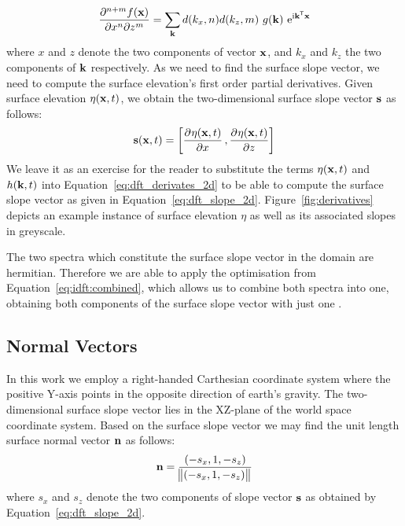 \begin{equation}
\label{eq:dft_derivates_2d}
 \dmd{f(\mvec{x})}{n+m}{x}{n}{z}{m} = \sum_{\mvec{k}}d(k_{x}, n)d(k_{z}, m)~g(\mvec{k})~\mathrm{e}^{\mathrm{i}\transpose{\mvec{k}}\mvec{x}}
\end{equation}
where $x$ and $z$ denote the two components of vector $\mathbf{x}$, and $k_x$ and $k_z$ 
the two components of \wavevector $\mathbf{k}$ respectively.
As we need to find the surface slope vector, we need to compute 
the surface elevation's first order partial derivatives. Given surface 
elevation $\eta(\mathbf{x},t)$, we obtain the two-dimensional surface slope 
vector $\mathbf{s}$ as follows:
\begin{equation}
\label{eq:dft_slope_2d}
 \mvec{s}(\mvec{x},t) = \left[\dpd{\eta(\mvec{x},t)}{x}, \dpd{\eta(\mvec{x},t)}{z}\right]
\end{equation}
We leave it as an exercise for the reader to substitute the terms $\eta(\mathbf{x},t)$
and $h(\mathbf{k},t)$ into Equation~\ref{eq:dft_derivates_2d} to be able to
compute the surface slope vector as given in Equation~\ref{eq:dft_slope_2d}.
Figure~\ref{fig:derivatives} depicts an example instance of surface 
elevation $\eta$ as well as its associated slopes in greyscale.

The two spectra which constitute the surface slope vector in the \wavevector domain
are hermitian. Therefore we are able to apply the optimisation from
Equation~\ref{eq:idft:combined}, which allows us to combine both spectra into one,
obtaining both components of the surface slope vector with just one \InvFourierTransform.
%
\subsection{Normal Vectors}
%
In this work we employ a right-handed Carthesian coordinate system where the positive
Y-axis points in the opposite direction of earth's gravity.
The two-dimensional surface slope vector lies in the XZ-plane of the world space
coordinate system. Based on the surface slope vector we may find the unit
length surface normal vector $\mathbf{n}$ as follows:
\begin{equation*}
 \mathbf{n} = \frac{(-s_x, 1, -s_z)}{\norm{(-s_x, 1, -s_z)}}
\end{equation*}
where $s_x$ and $s_z$ denote the two components of slope vector $\mathbf{s}$
as obtained by Equation~\ref{eq:dft_slope_2d}.
%
